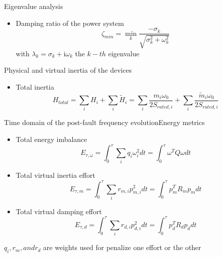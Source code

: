 \documentclass[aspectratio=169, 12pt]{beamer}
\begin{document}
\begin{frame}
  Eigenvalue analysis
  \begin{itemize}
    \item Damping ratio of the power system
    \begin{equation}
      \zeta_{min} = \min_{k}\frac{-\sigma_k}{\sqrt{\sigma_k^2 + \omega_k^2}}
    \end{equation}
    with $\lambda_k=\sigma_k + \text{i}\omega_k$ the $k-th$ eigenvalue
  \end{itemize}
  
  Physical and virtual inertia of the devices
\begin{itemize}
  \item Total inertia
  \begin{equation}
    H_{total} = \sum_{i}H_i + \sum_{i} \tilde{H}_i = \sum_{i}\frac{m_i \omega_0}{2 S_{rated,i}} + \sum_{i} \frac{\tilde{m}_i \omega_0}{2 S_{rated,i}}
  \end{equation} 
\end{itemize}
\end{frame}

\begin{frame}{Time domain of the post-fault frequency evolution}{Energy metrics}
  \begin{itemize}[<+(1)->]
      \item Total energy imbalance
      \begin{equation}
        E_{\tau,\omega}=\int_{0}^{\tau}\sum_{i} q_i\omega_i^{2}dt=\int_{0}^{\tau} \omega^T Q \omega dt
      \end{equation}
      
      \item Total virtual inertia effort
      \begin{equation}
        E_{\tau,m}=\int_{0}^{\tau}\sum_{i} r_{m,i}p_{m,i}^{2}dt=\int_{0}^{\tau} p_{m}^T R_m p_{m} dt
      \end{equation}

      \item Total virtual damping effort
      \begin{equation}
        E_{\tau,d}=\int_{0}^{\tau}\sum_{i} r_{d,i}p_{d,i}^{2}dt=\int_{0}^{\tau} p_{d}^T R_d p_{d} dt
      \end{equation}
    \end{itemize}

    $q_i, r_m, and r_d$ are weights used for penalize one effort or the other
\end{frame}
\end{document}
